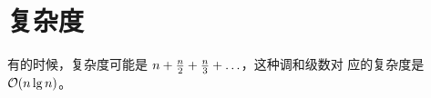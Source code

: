 
\section{复杂度}
有的时候，复杂度可能是 $n + {n \over 2} + {n \over 3} + \ldots$，这种调和级数对
应的复杂度是 $\mathcal{O}(n \lg n)$。


